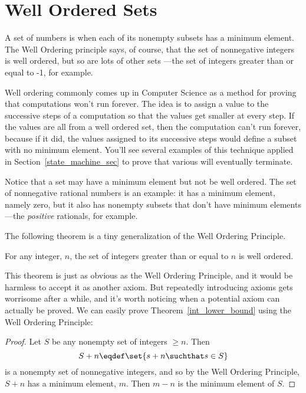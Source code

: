 \section{Well Ordered Sets}

A set of numbers is  when each of its nonempty
subsets has a minimum element.  The Well Ordering principle says, of
course, that the set of nonnegative integers is well ordered, but so
are lots of other sets ---the set of integers greater than or equal to
-1, for example.

Well ordering commonly comes up in Computer Science as a method for
proving that computations won't run forever.  The idea is to assign a
value to the successive steps of a computation so that the values get
smaller at every step.  If the values are all from a well ordered set,
then the computation can't run forever, because if it did, the values
assigned to its successive steps would define a subset with no minimum
element.  You'll see several examples of this technique applied in
Section~\ref{state_machine_sec} to prove that various  will eventually terminate.

Notice that a set may have a minimum element but not be well ordered.
The set of nonnegative rational numbers is an example: it has a
minimum element, namely zero, but it also has nonempty subsets that
don't have minimum elements ---the \emph{positive} rationals, for
example.

The following theorem is a tiny generalization of the Well Ordering
Principle.

\begin{theorem}\label{int_lower_bound}
For any integer, $n$, the set of integers greater than or equal to $n$
is well ordered.
\end{theorem}

This theorem is just as obvious as the Well Ordering Principle, and it
would be harmless to accept it as another axiom.  But repeatedly
introducing axioms gets worrisome after a while, and it's worth
noticing when a potential axiom can actually be proved.  We can easily
prove Theorem~\ref{int_lower_bound} using the Well Ordering Principle:

\begin{proof}
Let $S$ be any nonempty set of integers $\geq n$.  Then
\[
S+n \eqdef \set{s+n \suchthat s \in S}
\]
is a nonempty set of nonnegative integers, and so by the Well Ordering
Principle, $S+n$ has a minimum element, $m$.  Then $m - n$ is the
minimum element of $S$.
\end{proof}

